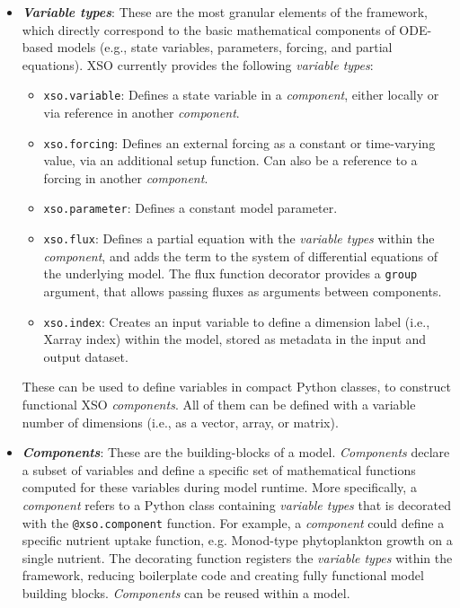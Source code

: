 \documentclass[gmd, manuscript]{copernicus}
\begin{document}
\begin{itemize}
    \item  \textbf{\textit{Variable types}}: These are the most granular elements of the framework, which directly correspond to the basic mathematical components of ODE-based models (e.g., state variables, parameters, forcing, and partial equations). XSO currently provides the following \textit{variable types}: 
    \begin{itemize}
        \item \texttt{xso.variable}: Defines a state variable in a \textit{component}, either locally or via reference in another \textit{component}.
        \item \texttt{xso.forcing}: Defines an external forcing as a constant or time-varying value, via an additional setup function. Can also be a reference to a forcing in another \textit{component}.
        \item \texttt{xso.parameter}: Defines a constant model parameter.
        \item \texttt{xso.flux}: Defines a partial equation with the \textit{variable types} within the \textit{component}, and adds the term to the system of differential equations of the underlying model. The flux function decorator provides a \texttt{group} argument, that allows passing fluxes as arguments between components.
        \item \texttt{xso.index}: Creates an input variable to define a dimension label (i.e., Xarray index) within the model, stored as metadata in the input and output dataset.
    \end{itemize}
    These can be used to define variables in compact Python classes, to construct functional XSO \textit{components}. All of them can be defined with a variable number of dimensions (i.e., as a vector, array, or matrix).

    \item \textbf{\textit{Components}}: These are the building-blocks of a model. \textit{Components} declare a subset of variables and define a specific set of mathematical functions computed for these variables during model runtime. More specifically, a \textit{component} refers to a Python class containing \textit{variable types} that is decorated with the \texttt{@xso.component} function. For example, a \textit{component} could define a specific nutrient uptake function, e.g. Monod-type phytoplankton growth on a single nutrient. The decorating function registers the \textit{variable types} within the framework, reducing boilerplate code and creating fully functional model building blocks. \textit{Components} can be reused within a model.
    

\end{itemize}
\end{document}
